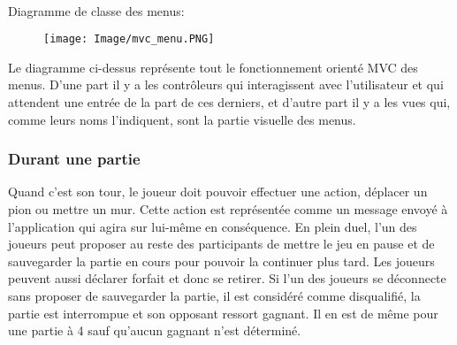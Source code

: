 \documentclass[french, utf8]{article}
\begin{document}
\begin{center}
\begin{tabular}{|m{3cm}|m{3cm}|m{3cm}|m{3cm}|m{3cm}|}
\hline
\end{tabular}\\
\end{center}
\label{sec:MenuPrincipalUser}
Diagramme de classe des menus:
\begin{figure}[ht]
\centering
    \texttt{[image: Image/mvc\_menu.PNG]}
\end{figure}

Le diagramme ci-dessus représente tout le fonctionnement orienté MVC des menus. D'une part il y a les contrôleurs qui interagissent avec l'utilisateur et qui attendent une entrée de la part de ces derniers, et d'autre part il y a les vues qui, comme leurs noms l'indiquent, sont la partie visuelle des menus. \newline



\subsubsection{Durant une partie}
Quand c'est son tour, le joueur doit pouvoir effectuer une action, déplacer un pion ou mettre un mur. Cette action est représentée comme un message envoyé à l'application qui agira sur lui-même en conséquence.
En plein duel, l'un des joueurs peut proposer au reste des participants de mettre le jeu en pause et de sauvegarder la partie en cours pour pouvoir la continuer plus tard. Les joueurs peuvent aussi déclarer forfait et donc se retirer. \newline
Si l'un des joueurs se déconnecte sans proposer de sauvegarder la partie, il est considéré comme disqualifié, la partie est interrompue et son opposant ressort gagnant. Il en est de même pour une partie à 4 sauf qu'aucun gagnant n'est déterminé.
\newline
\end{document}
